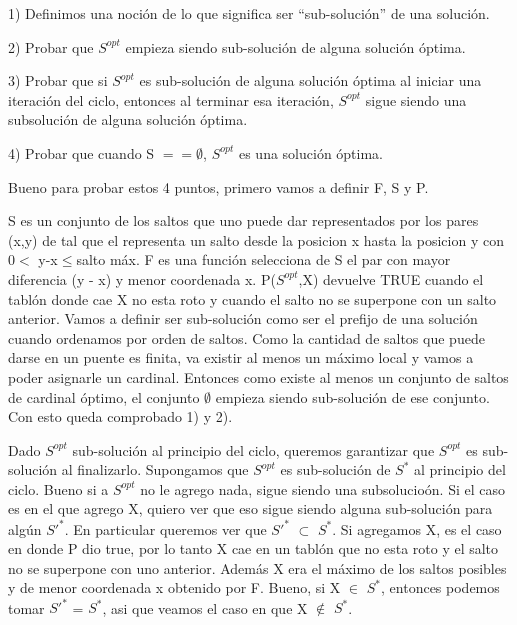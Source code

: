 
1) Definimos una noci\'on de lo que significa ser “sub-soluci\'on” de una soluci\'on.

2) Probar que $S^{opt}$ empieza siendo sub-soluci\'on de alguna soluci\'on \'optima.

3) Probar que si  $S^{opt}$ es sub-soluci\'on de alguna soluci\'on \'optima al iniciar 	una iteraci\'on del ciclo, entonces al terminar  esa iteraci\'on, $S^{opt}$ sigue siendo una subsoluci\'on de alguna soluci\'on \'optima.

4) Probar que cuando S $== \emptyset$, $S^{opt}$ es una soluci\'on \'optima.

Bueno para probar estos 4 puntos, primero vamos a definir F, S y P.


S es un conjunto de los saltos que uno puede dar representados por los pares (x,y) de tal que el representa un salto desde la posicion x hasta la posicion y con 0$<$ y-x$\leq$salto m\'ax.
F es una funci\'on selecciona de S el par con mayor diferencia (y - x) y menor coordenada x.
P($S^{opt}$,X) devuelve TRUE cuando el tabl\'on donde cae X no esta roto y cuando el salto no se superpone con un salto anterior.
Vamos a definir ser sub-soluci\'on como ser el prefijo de una soluci\'on cuando ordenamos por orden de saltos.
Como la cantidad de saltos que puede darse en un puente es finita, va existir al menos un m\'aximo local y vamos a poder asignarle un cardinal. Entonces como existe al menos un conjunto de saltos de cardinal \'optimo, el conjunto $\emptyset$ empieza siendo sub-soluci\'on de ese conjunto.
Con esto queda comprobado 1) y 2).

Dado $S^{opt}$ sub-soluci\'on al principio del ciclo, queremos garantizar que $S^{opt}$ es sub-soluci\'on al finalizarlo.
Supongamos que $S^{opt}$ es sub-soluci\'on de $S^{*}$ al principio del ciclo.
Bueno si a $S^{opt}$ no le agrego nada, sigue siendo una subsolucio\'on.
Si el caso es en el que agrego X, quiero ver que eso sigue siendo alguna sub-soluci\'on para alg\'un $S'^{*}$. En particular queremos ver que $S'^{*}$ $\subset$ $S^{*}$. 
Si agregamos X, es el caso en donde P dio true, por lo tanto X cae en un tabl\'on que no esta roto y el salto no se superpone con uno anterior.
Adem\'as X era el m\'aximo de los saltos posibles y de menor coordenada x obtenido por F.
Bueno, si X $\in$ $S^{*}$, entonces podemos tomar $S'^{*}$ = $S^{*}$, asi que veamos el caso en que X $\notin$ $S^{*}$.

